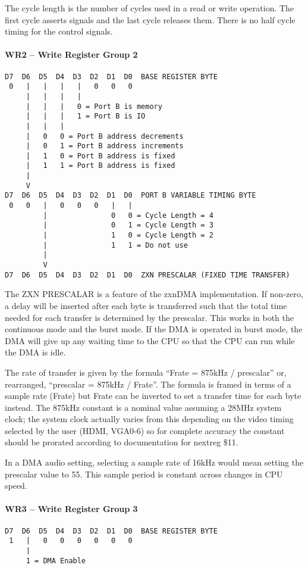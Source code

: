 \begin{multicols}{2}
The cycle length is the number of cycles used in a read or write
 operation. The first cycle asserts signals and the last cycle
 releases them. There is no half cycle timing for the control signals.

\paragraph{WR2 – Write Register Group 2}
\begin{verbatim}
D7  D6  D5  D4  D3  D2  D1  D0  BASE REGISTER BYTE
 0   |   |   |   |   0   0   0
     |   |   |   |
     |   |   |   0 = Port B is memory
     |   |   |   1 = Port B is IO
     |   |   |
     |   0   0 = Port B address decrements
     |   0   1 = Port B address increments
     |   1   0 = Port B address is fixed
     |   1   1 = Port B address is fixed
     |
     V
D7  D6  D5  D4  D3  D2  D1  D0  PORT B VARIABLE TIMING BYTE
 0   0   |   0   0   0   |   |
         |               0   0 = Cycle Length = 4
         |               0   1 = Cycle Length = 3
         |               1   0 = Cycle Length = 2
         |               1   1 = Do not use
         |
         V
D7  D6  D5  D4  D3  D2  D1  D0  ZXN PRESCALAR (FIXED TIME TRANSFER)
\end{verbatim}

The ZXN PRESCALAR is a feature of the zxnDMA implementation. If
non-zero, a delay will be inserted after each byte is transferred such
that the total time needed for each transfer is determined by the
prescalar. This works in both the continuous mode and the burst
mode. If the DMA is operated in burst mode, the DMA will give up any
waiting time to the CPU so that the CPU can run while the DMA is idle.

The rate of transfer is given by the formula ``Frate = 875kHz /
prescalar'' or, rearranged, ``prescalar = 875kHz / Frate''. The formula
is framed in terms of a sample rate (Frate) but Frate can be inverted
to set a transfer time for each byte instead. The 875kHz constant is a
nominal value assuming a 28MHz system clock; the system clock actually
varies from this depending on the video timing selected by the user
(HDMI, VGA0-6) so for complete accuracy the constant should be
prorated according to documentation for nextreg \$11.

In a DMA audio setting, selecting a sample rate of 16kHz would mean
setting the prescalar value to 55. This sample period is constant
across changes in CPU speed.

\paragraph{WR3 – Write Register Group 3}
\begin{verbatim}
D7  D6  D5  D4  D3  D2  D1  D0  BASE REGISTER BYTE
 1   |   0   0   0   0   0   0
     |
     1 = DMA Enable
\end{verbatim}


\end{multicols}
